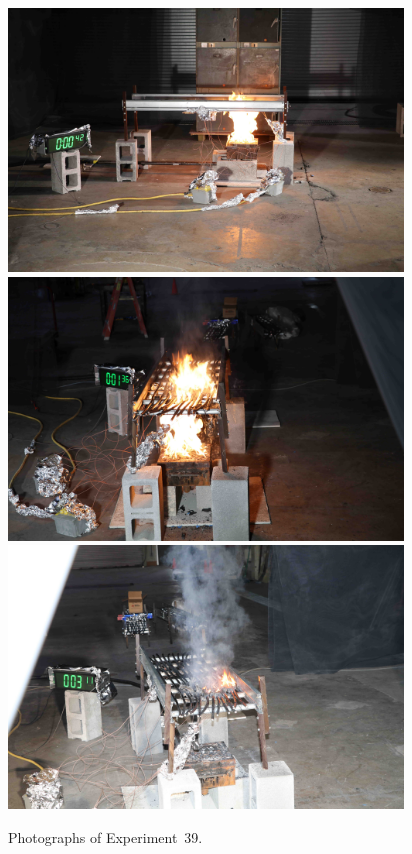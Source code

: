 \documentclass[12pt]{article}
\begin{document}
\begin{figure}[p]
\centering
\includegraphics[height=2.75in]{../FIGURES/Test_39_side} \\
\includegraphics[height=2.75in]{../FIGURES/Test_39_1_min_36_s} \\
\includegraphics[height=2.75in]{../FIGURES/Test_39_3_min_11_s}
\caption[Photographs of Experiment~39]{Photographs of Experiment~39.}
\label{fig:Test_39_photos}
\end{figure}


\clearpage
\end{document}
